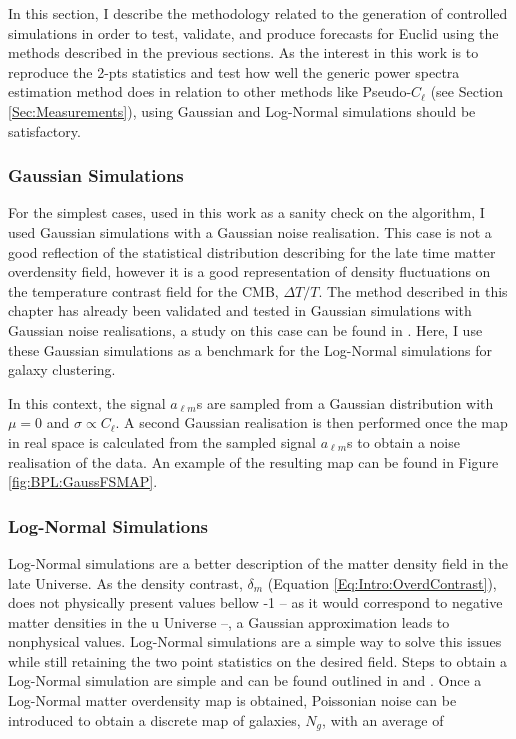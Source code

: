 \qquad In this section, I describe the methodology related to the generation of controlled simulations in order to test, validate, and produce forecasts for Euclid using the methods described in the previous sections.  As the interest in this work is to reproduce the 2-pts statistics and test how well the generic power spectra estimation method does in relation to other methods like Pseudo-$C_{\ell}$ (see Section \ref{Sec:Measurements}), using Gaussian and Log-Normal simulations should be satisfactory.

\subsubsection{Gaussian Simulations}
For the simplest cases, used in this work as a sanity check on the algorithm, I used Gaussian simulations with a Gaussian noise realisation. This case is not a good reflection of the statistical distribution describing for the late time matter overdensity field, however it is a good representation of density fluctuations on the temperature contrast field for the CMB, $\Delta T/T$. The method described in this chapter has already been validated and tested in Gaussian simulations with Gaussian noise realisations, a study on this case can be found in \cite{SreeThesis}. Here, I use these Gaussian simulations as a benchmark for the Log-Normal simulations for galaxy clustering.

\qquad In this context, the signal $a_{\ell m}$s are sampled from a Gaussian distribution with $\mu = 0$ and $\sigma \propto C_{\ell}$. A second Gaussian realisation is then performed once the map in real space is calculated from the sampled signal $a_{\ell m}$s to obtain a noise realisation of the data. An example of the resulting map can be found in Figure \ref{fig:BPL:GaussFSMAP}.

\subsubsection{Log-Normal Simulations}
Log-Normal simulations are a better description of the matter density field in the late Universe. As the density contrast, $\delta_m$ (Equation \ref{Eq:Intro:OverdContrast}), does not physically present values bellow -1 -- as it would correspond to negative matter densities in the u
Universe --, a Gaussian approximation leads to nonphysical values. Log-Normal simulations are a simple way to solve this issues while still retaining the two point statistics on the desired field. Steps to obtain a Log-Normal simulation are simple and can be found outlined in \cite{LoureiroMestrado} and \cite{Flask2016}. Once a Log-Normal matter overdensity map is obtained, Poissonian noise can be introduced to obtain a discrete map of galaxies, $N_{g}$, with an average of

